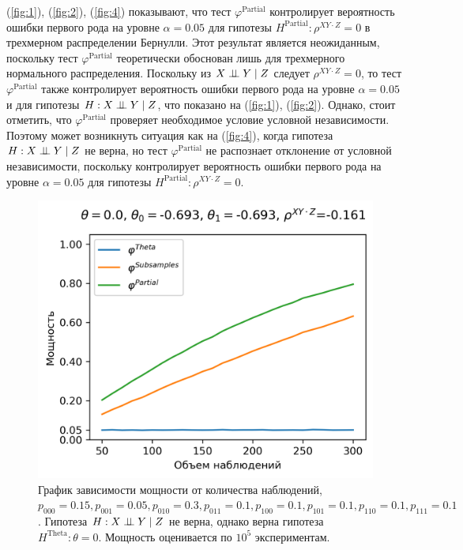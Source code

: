 (\autoref{fig:1}), (\autoref{fig:2}), (\autoref{fig:4}) показывают,
что тест $\varphi^{\text{Partial}}$ контролирует вероятность
ошибки первого рода на уровне $\alpha=0.05$ для гипотезы
$H^\text{Partial}: \rho^{XY\cdot Z}=0$ в трехмерном
распределении Бернулли. Этот результат является неожиданным,
поскольку тест $\varphi^{\text{Partial}}$ теоретически обоснован
лишь для трехмерного нормального распределения.
Поскольку из $X \perp\!\!\!\perp Y \mid Z$
следует $\rho^{XY\cdot Z}=0$, то тест $\varphi^{\text{Partial}}$ также
контролирует вероятность ошибки первого рода на уровне $\alpha=0.05$
и для гипотезы $H: X \perp\!\!\!\perp Y \mid Z$, что показано на 
(\autoref{fig:1}), (\autoref{fig:2}).
Однако, стоит отметить,
что $\varphi^{\text{Partial}}$ проверяет необходимое условие 
условной независимости. Поэтому может возникнуть ситуация
как на (\autoref{fig:4}), когда гипотеза $H: X \perp\!\!\!\perp Y \mid Z$ не верна, 
но тест $\varphi^{\text{Partial}}$ не распознает отклонение от условной независимости, поскольку
контролирует вероятность ошибки первого рода 
на уровне $\alpha=0.05$ для гипотезы $H^{\text{Partial}}: \rho^{XY\cdot Z}=0$.

\begin{figure}[H]
    \centering
    \includegraphics[scale=0.55]{images/graph5.png}
    \caption{График зависимости мощности от количества наблюдений,
    $p_{000}=0.15, p_{001}=0.05, 
    p_{010}=0.3, p_{011}=0.1,
    p_{100}=0.1, p_{101}=0.1, p_{110}=0.1, p_{111}=0.1$. 
    Гипотеза $H: X \perp\!\!\!\perp Y \mid Z$ не верна, однако верна гипотеза $H^{\text{Theta}}: \theta=0$.
    Мощность оценивается по $10^5$ экспериментам.} \label{fig:5}
\end{figure}

